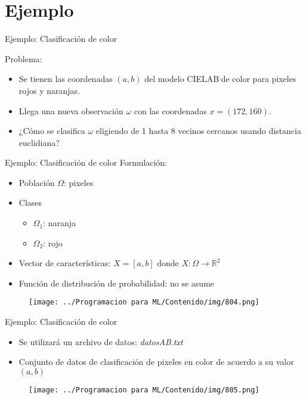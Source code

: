 \documentclass[11pt,aspectratio=169]{beamer}
\begin{document}
\section{Ejemplo}

\begin{frame}{Ejemplo: Clasificación de color}
\begin{block}{Problema:}
	\begin{itemize}
		\item Se tienen las coordenadas $(a,b)$ del modelo CIELAB\footnotemark[2]$^,$\footnotemark[3] de color para pixeles 
			rojos y naranjas.\pause
		\item Llega una nueva observación $\omega$ con las coordenadas $x=(172,160)$.\pause
		\item ¿Cómo se clasifica $\omega$ eligiendo de 1 hasta 8 vecinos cercanos usando distancia euclidiana?
	\end{itemize}
\end{block}
\end{frame}

\begin{frame}{Ejemplo: Clasificación de color}
Formulación:\pause
\begin{itemize}
	\item Población $\Omega$: pixeles\pause
	\item Clases\pause
		\begin{itemize}
			\item $\Omega_1$: naranja\pause
			\item $\Omega_2$: rojo\pause
		\end{itemize}
	\item Vector de características: $X=[a,b]$ donde $X:\Omega \rightarrow \mathbb{R}^2$\pause
	\item Función de distribución de probabilidad: no se asume\pause
\end{itemize}
\begin{figure}[H]
	\centering
	\texttt{[image: ../Programacion para ML/Contenido/img/804.png]}
\end{figure}
\end{frame}

\begin{frame}{Ejemplo: Clasificación de color}
\begin{itemize}
	\item Se utilizará un archivo de datos: \textit{datosAB.txt}
	\item Conjunto de datos de clasificación de pixeles en color de acuerdo a su valor $(a,b)$
\end{itemize}
\begin{figure}[H]
	\centering
	\texttt{[image: ../Programacion para ML/Contenido/img/805.png]}
\end{figure}
\end{frame}
\end{document}
